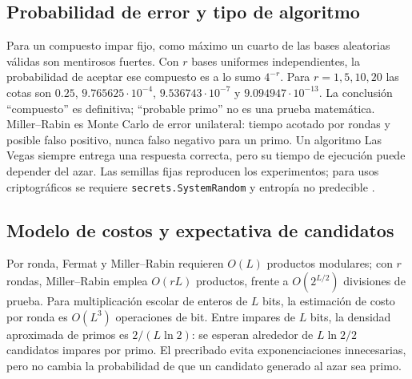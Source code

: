 \subsection{Probabilidad de error y tipo de algoritmo}
Para un compuesto impar fijo, como máximo un cuarto de las bases aleatorias válidas son mentirosos fuertes. Con $r$ bases uniformes independientes, la probabilidad de aceptar ese compuesto es a lo sumo $4^{-r}$. Para $r=1,5,10,20$ las cotas son $0.25$, $9.765625\cdot10^{-4}$, $9.536743\cdot10^{-7}$ y $9.094947\cdot10^{-13}$. La conclusión ``compuesto'' es definitiva; ``probable primo'' no es una prueba matemática. Miller--Rabin es Monte Carlo de error unilateral: tiempo acotado por rondas y posible falso positivo, nunca falso negativo para un primo. Un algoritmo Las Vegas siempre entrega una respuesta correcta, pero su tiempo de ejecución puede depender del azar. Las semillas fijas reproducen los experimentos; para usos criptográficos se requiere \texttt{secrets.SystemRandom} y entropía no predecible \cite{pythonsecrets}.

\subsection{Modelo de costos y expectativa de candidatos}
Por ronda, Fermat y Miller--Rabin requieren $O(L)$ productos modulares; con $r$ rondas, Miller--Rabin emplea $O(rL)$ productos, frente a $O(2^{L/2})$ divisiones de prueba. Para multiplicación escolar de enteros de $L$ bits, la estimación de costo por ronda es $O(L^3)$ operaciones de bit. Entre impares de $L$ bits, la densidad aproximada de primos es $2/(L\ln2)$: se esperan alrededor de $L\ln2/2$ candidatos impares por primo. El precribado evita exponenciaciones innecesarias, pero no cambia la probabilidad de que un candidato generado al azar sea primo.
